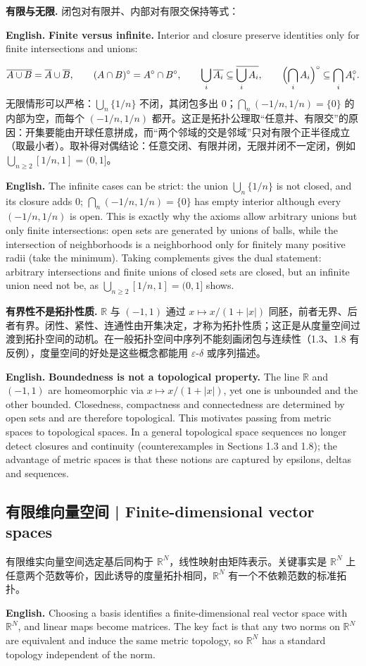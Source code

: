 \documentclass[UTF8,11pt,a4paper]{ctexart}
\newcommand{\EN}[1]{\par\noindent\textbf{English.} #1\par}
\begin{document}
\noindent\textbf{有限与无限.} 闭包对有限并、内部对有限交保持等式：
\EN{\textbf{Finite versus infinite.} Interior and closure preserve identities only for finite intersections and unions:}
\[
\overline{A\cup B}=\overline A\cup\overline B,\qquad
(A\cap B)^\circ=A^\circ\cap B^\circ,\qquad
\bigcup_i\overline{A_i}\subseteq\overline{\bigcup_iA_i},\qquad
\Bigl(\bigcap_iA_i\Bigr)^\circ\subseteq\bigcap_iA_i^\circ .
\]
\noindent 无限情形可以严格：$\bigcup_n\{1/n\}$ 不闭，其闭包多出 $0$；$\bigcap_n(-1/n,1/n)=\{0\}$ 的内部为空，而每个 $(-1/n,1/n)$ 都开。这正是拓扑公理取“任意并、有限交”的原因：开集要能由开球任意拼成，而“两个邻域的交是邻域”只对有限个正半径成立（取最小者）。取补得对偶结论：任意交闭、有限并闭，无限并闭不一定闭，例如 $\bigcup_{n\ge2}[1/n,1]=(0,1]$。
\EN{The infinite cases can be strict: the union $\bigcup_n\{1/n\}$ is not closed, and its closure adds $0$; $\bigcap_n(-1/n,1/n)=\{0\}$ has empty interior although every $(-1/n,1/n)$ is open. This is exactly why the axioms allow arbitrary unions but only finite intersections: open sets are generated by unions of balls, while the intersection of neighborhoods is a neighborhood only for finitely many positive radii (take the minimum). Taking complements gives the dual statement: arbitrary intersections and finite unions of closed sets are closed, but an infinite union need not be, as $\bigcup_{n\ge2}[1/n,1]=(0,1]$ shows.}

\noindent\textbf{有界性不是拓扑性质.} $\mathbb R$ 与 $(-1,1)$ 通过 $x\mapsto x/(1+|x|)$ 同胚，前者无界、后者有界。闭性、紧性、连通性由开集决定，才称为拓扑性质；这正是从度量空间过渡到拓扑空间的动机。在一般拓扑空间中序列不能刻画闭包与连续性（1.3、1.8 有反例），度量空间的好处是这些概念都能用 $\varepsilon$-$\delta$ 或序列描述。
\EN{\textbf{Boundedness is not a topological property.} The line $\mathbb R$ and $(-1,1)$ are homeomorphic via $x\mapsto x/(1+|x|)$, yet one is unbounded and the other bounded. Closedness, compactness and connectedness are determined by open sets and are therefore topological. This motivates passing from metric spaces to topological spaces. In a general topological space sequences no longer detect closures and continuity (counterexamples in Sections 1.3 and 1.8); the advantage of metric spaces is that these notions are captured by epsilons, deltas and sequences.}

\subsection{有限维向量空间 | Finite-dimensional vector spaces}
\noindent 有限维实向量空间选定基后同构于 $\mathbb R^N$，线性映射由矩阵表示。关键事实是 $\mathbb R^N$ 上任意两个范数等价，因此诱导的度量拓扑相同，$\mathbb R^N$ 有一个不依赖范数的标准拓扑。
\EN{Choosing a basis identifies a finite-dimensional real vector space with $\mathbb R^N$, and linear maps become matrices. The key fact is that any two norms on $\mathbb R^N$ are equivalent and induce the same metric topology, so $\mathbb R^N$ has a standard topology independent of the norm.}
\end{document}
